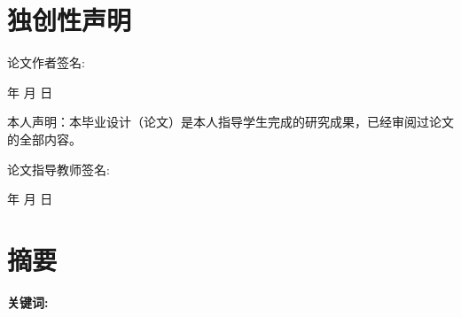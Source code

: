 {  %
  \vspace{27.5pt}
  \chapter*{\textbf{\centering\erhao\songti 独创性声明}}
  \vspace{27.5pt}
  \sanhaoup %
  \@cdeclaration 
  \vspace{40pt} %

  \begin{center}
    论文作者签名:
  \end{center}

  \hfill  年 \hspace{1cm} 月 \hspace{1cm} 日

  \vspace{40pt} %
  本人声明：本毕业设计（论文）是本人指导学生完成的研究成果，已经审阅过论文的全部内容。

  \vspace{20pt} %
  \begin{center}
    论文指导教师签名:
  \end{center}

  \hfill  年 \hspace{1cm} 月 \hspace{1cm} 日

  \thispagestyle{empty}

  \chapter*{\textbf{\centering\erhao\songti 摘\quad 要}}
  \setcounter{page}{1}                                 %

  \fontsize{12pt}{20pt}\selectfont %
  \@cabstract

  \vspace{\baselineskip}

  \noindent\textbf{\songti\sihao 关键词:} \@ckeywords


}
